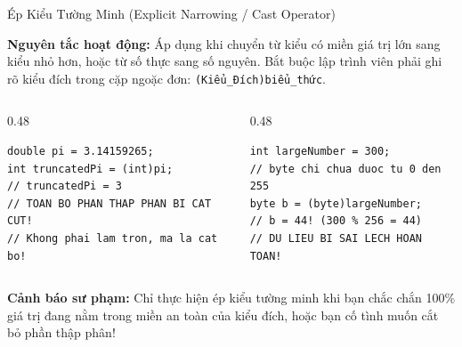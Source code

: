 \documentclass[aspectratio=169, 10pt]{beamer}
\begin{document}
\begin{frame}[fragile]{Ép Kiểu Tường Minh (Explicit Narrowing / Cast Operator)}
  \begin{alertblock}{\textbf{Nguyên tắc hoạt động:}}
    Áp dụng khi chuyển từ kiểu có miền giá trị lớn sang kiểu nhỏ hơn, hoặc từ số thực sang số nguyên. Bắt buộc lập trình viên phải ghi rõ kiểu đích trong cặp ngoặc đơn: \texttt{(Kiểu\_Đích)biểu\_thức}.
  \end{alertblock}

  \begin{columns}[T]
    \begin{column}{0.48\textwidth}
      \begin{tcolorbox}[colback=AlertRed!10,colframe=AlertRed,title=\textbf{Rủi ro 1: Mất độ chính xác (Precision Loss)},fonttitle=\small\bfseries]
\begin{lstlisting}[numbers=none]
double pi = 3.14159265;
int truncatedPi = (int)pi; 
// truncatedPi = 3
// TOAN BO PHAN THAP PHAN BI CAT CUT!
// Khong phai lam tron, ma la cat bo!
\end{lstlisting}
      \end{tcolorbox}
    \end{column}

    \begin{column}{0.48\textwidth}
      \begin{tcolorbox}[colback=AlertRed!10,colframe=AlertRed,title=\textbf{Rủi ro 2: Tràn số âm thầm (Data Overflow)},fonttitle=\small\bfseries]
\begin{lstlisting}[numbers=none]
int largeNumber = 300;
// byte chi chua duoc tu 0 den 255
byte b = (byte)largeNumber; 
// b = 44! (300 % 256 = 44)
// DU LIEU BI SAI LECH HOAN TOAN!
\end{lstlisting}
      \end{tcolorbox}
    \end{column}
  \end{columns}

  \begin{exampleblock}{\textbf{Cảnh báo sư phạm:}}
    Chỉ thực hiện ép kiểu tường minh khi bạn chắc chắn 100\% giá trị đang nằm trong miền an toàn của kiểu đích, hoặc bạn cố tình muốn cắt bỏ phần thập phân!
  \end{exampleblock}
\end{frame}
\end{document}
